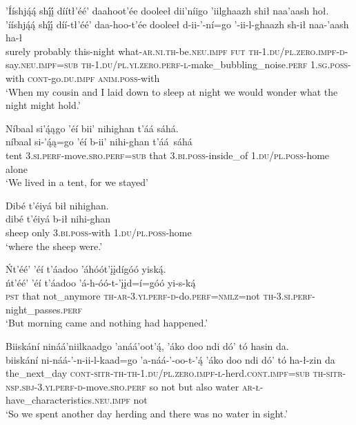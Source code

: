 \ea\label{ex:text6-13-10}
’Ííshją́ą́ shį́į́ díítł’éé’ daahoot’ée dooleeł dii’níigo ’iilghaazh shił naa’aash hoł.\\
\gll ’ííshją́ą́	shį́į́	díí-tł’éé’	daa-hoo-t’ée	dooleeł	d-ii-’-ní=go	’-ii-l-ghaazh	sh-ił	naa-’aash	ha-ł\\
     surely	probably	this-night	what-\textsc{ar}.\textsc{ni}.\textsc{th}-be.\textsc{neu}.\textsc{impf}	\textsc{fut}	\textsc{th}-1.\textsc{du}/\textsc{pl}.\textsc{zero}.\textsc{impf}-\textsc{d}-say.\textsc{neu}.\textsc{impf}=\textsc{sub}	\textsc{th}-1.\textsc{du}/\textsc{pl}.\textsc{yi}.\textsc{zero}.\textsc{perf}-\textsc{l}-make\_bubbling\_noise.\textsc{perf}	1.\textsc{sg}.\textsc{poss}-with	\textsc{cont}-go.\textsc{du}.\textsc{impf}	\textsc{anim}.\textsc{poss}-with\\
\glt `When my cousin and I laid down to sleep at night we would wonder what the night might hold.'
\z

\ea\label{ex:text6-13-11}
Níbaal si’ą́ągo ’éí bii’ nihighan t’áá sáhá.\\
\gll níbaal	si-’ą́ą=go	’éí	b-ii’	nihi-ghan	t’áá~{sáhá}\\
     tent	3.\textsc{si}.\textsc{perf}-move.\textsc{sro}.\textsc{perf}=\textsc{sub}	that	3.\textsc{bi}.\textsc{poss}-inside\_of	1.\textsc{du}/\textsc{pl}.\textsc{poss}-home	alone\\
\glt `We lived in a tent, for we stayed'
\z

\ea\label{ex:text6-13-12}
Dibé t’éiyá bił nihighan.\\
\gll dibé	t’éiyá	b-ił	nihi-ghan\\
     sheep	only	3.\textsc{bi}.\textsc{poss}-with	1.\textsc{du}/\textsc{pl}.\textsc{poss}-home\\
\glt `where the sheep were.'
\z

\ea\label{ex:text6-13-13}
Ńt’éé’ ’éí t’áadoo ’áhóót’įįdígóó yiską́.\\
\gll ńt’éé’	’éí	t’áadoo	’á-h-óó-t-’įįd=í=góó	yi-s-ką́\\
     \textsc{pst}	that	not\_anymore	\textsc{th}-\textsc{ar}-3.\textsc{yi}.\textsc{perf}-\textsc{d}-do.\textsc{perf}=\textsc{nmlz}=not	\textsc{th}-3.\textsc{si}.\textsc{perf}-night\_passes.\textsc{perf}\\
\glt `But morning came and nothing had happened.'
\z

\ea\label{ex:text6-13-14}
Biiskání nináá’niilkaadgo ’anáá’oot’ą́, ’áko doo ndi dó’ tó hasin da.\\
\gll biiskání	ni-náá-’-n-ii-l-kaad=go	’a-náá-’-oo-t-’ą́	’áko	doo	ndi	dó’	tó	ha-ł-zin	da\\
     the\_next\_day	\textsc{cont}-\textsc{sitr}-\textsc{th}-\textsc{th}-1.\textsc{du}/\textsc{pl}.\textsc{zero}.\textsc{impf}-\textsc{l}-herd.\textsc{cont}.\textsc{impf}=\textsc{sub}	\textsc{th}-\textsc{sitr}-\textsc{nsp}.\textsc{sbj}-3.\textsc{yi}.\textsc{perf}-\textsc{d}-move.\textsc{sro}.\textsc{perf}	so	not	but	also	water	\textsc{ar}-\textsc{ł}-have\_characteristics.\textsc{neu}.\textsc{impf}	not\\
\glt `So we spent another day herding and there was no water in sight.'
\z

